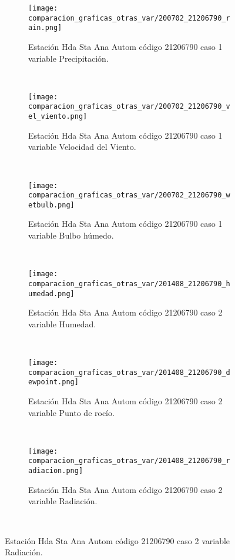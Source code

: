 \begin{figure}[H]
\centering
\begin{subfigure}[normla]{0.4\textwidth}
\caption{Estación Hda Sta Ana Autom código 21206790 caso 1 variable Precipitación.}
\texttt{[image: comparacion\_graficas\_otras\_var/200702\_21206790\_rain.png]}
\end{subfigure}
~
\begin{subfigure}[normla]{0.4\textwidth}
\caption{Estación Hda Sta Ana Autom código 21206790 caso 1 variable Velocidad del Viento.}
\texttt{[image: comparacion\_graficas\_otras\_var/200702\_21206790\_vel\_viento.png]}
\end{subfigure}
~
\begin{subfigure}[normla]{0.4\textwidth}
\caption{Estación Hda Sta Ana Autom código 21206790 caso 1 variable Bulbo húmedo.}
\texttt{[image: comparacion\_graficas\_otras\_var/200702\_21206790\_wetbulb.png]}
\end{subfigure}
~
\begin{subfigure}[normla]{0.4\textwidth}
\caption{Estación Hda Sta Ana Autom código 21206790 caso 2 variable Humedad.}
\texttt{[image: comparacion\_graficas\_otras\_var/201408\_21206790\_humedad.png]}
\end{subfigure}
~
\begin{subfigure}[normla]{0.4\textwidth}
\caption{Estación Hda Sta Ana Autom código 21206790 caso 2 variable Punto de rocío.}
\texttt{[image: comparacion\_graficas\_otras\_var/201408\_21206790\_dewpoint.png]}
\end{subfigure}
~
\begin{subfigure}[normla]{0.4\textwidth}
\caption{Estación Hda Sta Ana Autom código 21206790 caso 2 variable Radiación.}
\texttt{[image: comparacion\_graficas\_otras\_var/201408\_21206790\_radiacion.png]}
\end{subfigure}
~
\end{figure}
           
